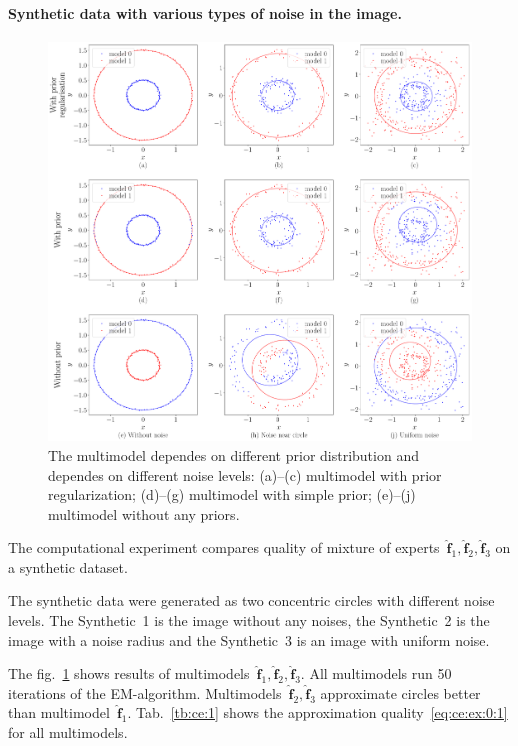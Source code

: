\documentclass[12pt, twoside]{article}
\numberwithin{equation}{section}
\begin{document}
\paragraph{Synthetic data with various types of noise in the image.}
\begin{figure}[h!t]\center
\includegraphics[width=1\textwidth]{result_eng/experiment_synthetic}
\caption{The multimodel dependes on different prior distribution and dependes on different noise levels: (a)--(c) multimodel with prior regularization; (d)--(g) multimodel with simple prior; (e)--(j) multimodel without any priors.}
\label{experiment:1}
\end{figure}
The computational experiment compares quality of mixture of experts~$\hat{\mathbf{f}}_1, \hat{\mathbf{f}}_2, \hat{\mathbf{f}}_3$ on a synthetic dataset.

The synthetic data were generated as two concentric circles with different noise levels.
The Synthetic~1 is the image without any noises, the Synthetic~2 is the image with a noise radius and the Synthetic~3 is an image with uniform noise.

The fig.~\ref{experiment:1} shows results of multimodels~$\hat{\mathbf{f}}_1, \hat{\mathbf{f}}_2, \hat{\mathbf{f}}_3$.
All multimodels run 50 iterations of the EM-algorithm.
Multimodels~$\hat{\mathbf{f}}_2, \hat{\mathbf{f}}_3$ approximate circles better than multimodel~$\hat{\mathbf{f}}_1$. Tab.~\ref{tb:ce:1} shows the approximation quality~\eqref{eq:ce:ex:0:1} for all multimodels.
\end{document}
